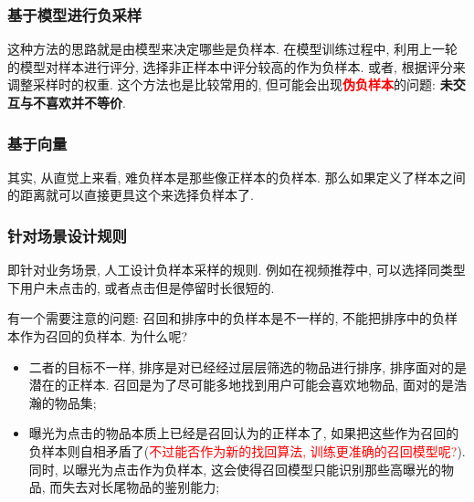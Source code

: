 \subsubsection{基于模型进行负采样}
这种方法的思路就是由模型来决定哪些是负样本. 在模型训练过程中, 利用上一轮的模型对样本进行评分, 选择非正样本中评分较高的作为负样本. 或者, 根据评分来调整采样时的权重. 这个方法也是比较常用的, 但可能会出现\textcolor{red}{\textbf{伪负样本}}的问题: \textbf{未交互与不喜欢并不等价}.

\subsubsection{基于向量}
其实, 从直觉上来看, 难负样本是那些像正样本的负样本. 那么如果定义了样本之间的距离就可以直接更具这个来选择负样本了.

\subsubsection{针对场景设计规则}
即针对业务场景, 人工设计负样本采样的规则. 例如在视频推荐中, 可以选择同类型下用户未点击的, 或者点击但是停留时长很短的.

有一个需要注意的问题: 召回和排序中的负样本是不一样的, 不能把排序中的负样本作为召回的负样本. 为什么呢?
\begin{itemize}
	\item 二者的目标不一样, 排序是对已经经过层层筛选的物品进行排序, 排序面对的是潜在的正样本. 召回是为了尽可能多地找到用户可能会喜欢地物品, 面对的是浩瀚的物品集;
	
	\item 曝光为点击的物品本质上已经是召回认为的正样本了, 如果把这些作为召回的负样本则自相矛盾了(\textcolor{red}{不过能否作为新的找回算法, 训练更准确的召回模型呢?}). 同时, 以曝光为点击作为负样本, 这会使得召回模型只能识别那些高曝光的物品, 而失去对长尾物品的鉴别能力;
	
\end{itemize}